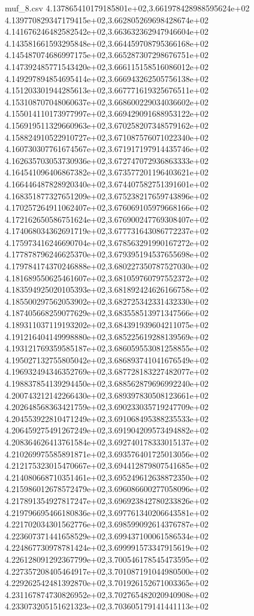 \begin{filecontents*}{muf_8.csv}
4.137865410179185801e+02,3.661978428988595624e+02
4.139770829347179415e+02,3.662805269698428674e+02
4.141676246482582542e+02,3.663632362947946604e+02
4.143581661593295848e+02,3.664459708795366168e+02
4.145487074686997175e+02,3.665287307298676751e+02
4.147392485771543420e+02,3.666115158516086012e+02
4.149297894854695414e+02,3.666943262505756138e+02
4.151203301944285613e+02,3.667771619325676511e+02
4.153108707048060637e+02,3.668600229034036602e+02
4.155014110173977997e+02,3.669429091688953122e+02
4.156919511329660963e+02,3.670258207348579162e+02
4.158824910522910727e+02,3.671087576071022340e+02
4.160730307761674567e+02,3.671917197914435746e+02
4.162635703053730936e+02,3.672747072936863333e+02
4.164541096406867382e+02,3.673577201196403621e+02
4.166446487828920340e+02,3.674407582751391601e+02
4.168351877327651209e+02,3.675238217659743896e+02
4.170257264911062407e+02,3.676069105979668166e+02
4.172162650586751624e+02,3.676900247769308407e+02
4.174068034362691719e+02,3.677731643086772237e+02
4.175973416246690704e+02,3.678563291990167272e+02
4.177878796246625370e+02,3.679395194537655698e+02
4.179784174370246888e+02,3.680227350787527030e+02
4.181689550625461607e+02,3.681059760797552372e+02
4.183594925020105393e+02,3.681892424626166758e+02
4.185500297562053902e+02,3.682725342331432330e+02
4.187405668259077629e+02,3.683558513971347566e+02
4.189311037119193202e+02,3.684391939604211075e+02
4.191216404149998880e+02,3.685225619288139569e+02
4.193121769359585187e+02,3.686059553081258855e+02
4.195027132755805042e+02,3.686893741041676549e+02
4.196932494346352769e+02,3.687728183227482077e+02
4.198837854139294450e+02,3.688562879696992240e+02
4.200743212142266430e+02,3.689397830508123661e+02
4.202648568363421759e+02,3.690233035719247709e+02
4.204553922810471249e+02,3.691068495388235533e+02
4.206459275491267249e+02,3.691904209573494882e+02
4.208364626413761584e+02,3.692740178333015137e+02
4.210269975585891871e+02,3.693576401725013056e+02
4.212175323015470667e+02,3.694412879807541685e+02
4.214080668710351461e+02,3.695249612638872350e+02
4.215986012678572479e+02,3.696086600277058096e+02
4.217891354927817247e+02,3.696923842780233826e+02
4.219796695466180836e+02,3.697761340206643581e+02
4.221702034301562776e+02,3.698599092614376787e+02
4.223607371441658529e+02,3.699437100061586534e+02
4.224867730978781424e+02,3.699991573347915619e+02
4.226128091292367799e+02,3.700546178545473595e+02
4.227357208405464917e+02,3.701087191044980500e+02
4.229262542481392870e+02,3.701926152671003365e+02
4.231167874730826952e+02,3.702765482020940908e+02
4.233073205151621323e+02,3.703605179141441113e+02

\end{filecontents*}

